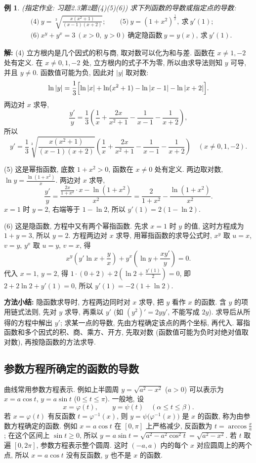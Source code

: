 \documentclass[UTF8,openany]{ctexbook}
\theoremstyle{chinesetextbook}
\newtheorem{example}{例}[section]
\newenvironment{cnsolution}{\par\indent\textbf{解:} \ignorespaces}{\par}
\begin{document}
\begin{example}\label{ex:c2-h3-2}
\textnormal{(指定作业: 习题2.3第2题(4)(5)(6))} 求下列函数的导数或指定点的导数:
\[
\begin{aligned}
&\text{(4)}\ y=\sqrt[3]{\frac{x(x^2+1)}{(x-1)(x+2)}};\qquad\text{(5)}\ y=(1+x^2)^{\frac1x},\ \text{求}\ y'(1);\\
&\text{(6)}\ x^y+y^x=3\ (x>0,\ y>0)\ \text{确定隐函数}\ y=y(x),\ \text{求}\ y'(1).
\end{aligned}
\]
\end{example}
\begin{cnsolution}
(4) 立方根内是几个因式的积与商, 取对数可以化为和与差. 函数在 $x\ne1,-2$ 处有定义. 在 $x\ne0,1,-2$ 处, 立方根内的式子不为零, 所以由求导法则知 $y$ 可导, 并且 $y\ne0$. 函数值可能为负, 因此对 $|y|$ 取对数:
\[
\ln|y|=\frac13\Bigl[\ln|x|+\ln(x^2+1)-\ln|x-1|-\ln|x+2|\Bigr].
\]
两边对 $x$ 求导,
\[
\frac{y'}y=\frac13\left(\frac1x+\frac{2x}{x^2+1}-\frac1{x-1}-\frac1{x+2}\right),
\]
所以
\[
y'=\frac13\sqrt[3]{\frac{x(x^2+1)}{(x-1)(x+2)}}\left(\frac1x+\frac{2x}{x^2+1}-\frac1{x-1}-\frac1{x+2}\right)\quad(x\ne0,1,-2).
\]

(5) 这是幂指函数, 底数 $1+x^2>0$, 函数在 $x\ne0$ 处有定义. 两边取对数, $\displaystyle\ln y=\frac{\ln(1+x^2)}x$. 两边对 $x$ 求导,
\[
\frac{y'}y=\frac{\frac{2x}{1+x^2}\cdot x-\ln(1+x^2)}{x^2}=\frac2{1+x^2}-\frac{\ln(1+x^2)}{x^2}.
\]
$x=1$ 时 $y=2$, 右端等于 $1-\ln2$, 所以 $y'(1)=2(1-\ln2)$.

(6) 这是隐函数, 方程中又有两个幂指函数. 先求 $x=1$ 时 $y$ 的值, 这时方程成为 $1+y=3$, 所以 $y=2$. 方程两边对 $x$ 求导, 用幂指函数的求导公式时, $x^y$ 取 $u=x$, $v=y$, $y^x$ 取 $u=y$, $v=x$, 得
\[
x^y\left(y'\ln x+\frac yx\right)+y^x\left(\ln y+\frac{xy'}y\right)=0.
\]
代入 $x=1$, $y=2$, 得 $\displaystyle1\cdot(0+2)+2\left(\ln2+\frac{y'(1)}2\right)=0$, 即 $2+2\ln2+y'(1)=0$, 所以 $y'(1)=-2(1+\ln2)$.
\end{cnsolution}
\par\indent\textbf{方法小结:} 隐函数求导时, 方程两边同时对 $x$ 求导, 把 $y$ 看作 $x$ 的函数. 含 $y$ 的项用链式法则, 先对 $y$ 求导, 再乘以 $y'$ (如 $(y^2)'=2yy'$, 不能写成 $2y$). 求导后从所得的方程中解出 $y'$; 求某一点的导数, 先由方程确定该点的两个坐标, 再代入. 幂指函数和多个因式的积、商、乘方、开方, 先取对数 (函数值可能为负时对绝对值取对数), 再按隐函数的方法求导.
\subsection{参数方程所确定的函数的导数}
曲线常用参数方程表示. 例如上半圆周 $y=\sqrt{a^2-x^2}$ ($a>0$) 可以表示为 $x=a\cos t$, $y=a\sin t$ ($0\le t\le\pi$). 一般地, 设
\[
x=\varphi(t),\qquad y=\psi(t)\quad(\alpha\le t\le\beta).
\]
若 $x=\varphi(t)$ 有反函数 $t=\varphi^{-1}(x)$, 则 $y=\psi\bigl(\varphi^{-1}(x)\bigr)$ 是 $x$ 的函数, 称为由参数方程确定的函数. 例如 $x=a\cos t$ 在 $[0,\pi]$ 上严格减少, 反函数为 $\displaystyle t=\arccos\frac xa$; 在这个区间上 $\sin t\ge0$, 所以 $y=a\sin t=\sqrt{a^2-a^2\cos^2t}=\sqrt{a^2-x^2}$. 若 $t$ 取遍 $[0,2\pi]$, 参数方程表示整个圆周. 这时 $(-a,a)$ 内的每个 $x$ 对应圆周上的两个点, 所以 $x=a\cos t$ 没有反函数, $y$ 也不是 $x$ 的函数.
\end{document}
